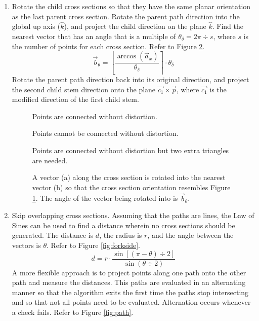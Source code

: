 \documentclass[10pt]{article}
\begin{document}
\begin{enumerate}
\item Rotate the child cross sections so that they have the same planar orientation as the last parent cross section. Rotate the parent path direction into the global up axis ($ \hat{k} $), and project the child direction on the plane $ \hat{k} $. Find the nearest vector that has an angle that is a multiple of $ \theta_{\delta} = 2 \pi \div s $, where $ s $ is the number of points for each cross section. Refer to Figure \ref{fig:forktopangle}.
\[ \vec{b}_{\theta} = \left \lfloor \frac{\arccos(\vec{a}_x)}{\theta_{\delta}} \right\rceil \cdot \theta_{\delta} \]
Rotate the parent path direction back into its original direction, and project the second child stem direction onto the plane $ \vec{c_1} \times \vec{p} $, where $ \vec{c_1} $ is the modified direction of the first child stem.

\begin{figure}[H]
 \begin{minipage}[b]{0.46\textwidth}
  \centering
  
  \caption{Points are connected without distortion.} \label{fig:fork1}
 \end{minipage}
 \hfill
 \begin{minipage}[b]{0.46\textwidth}
  \centering
  
  \caption{Points cannot be connected without distortion.}
 \end{minipage}
\end{figure}
\begin{figure}[H]
 \begin{minipage}[b]{0.46\textwidth}
  \centering
  
  \caption{Points are connected without distortion but two extra triangles are needed.}
 \end{minipage}
 \hfill
 \begin{minipage}[b]{0.46\textwidth}
  \centering
  
  \caption{A vector (a) along the cross section is rotated into the nearest vector (b) so that the cross section orientation resembles Figure \ref{fig:fork1}. The angle of the vector being rotated into is $ \vec{b}_{\theta} $.} \label{fig:forktopangle}
 \end{minipage}
\end{figure}

\item Skip overlapping cross sections. Assuming that the paths are lines, the Law of Sines can be used to find a distance wherein no cross sections should be generated. The distance is $ d $, the radius is $ r $, and the angle between the vectors is $ \theta $. Refer to Figure \ref{fig:forkside}.
\[ d = r \cdot \frac{\sin[(\pi-\theta)\div2]}{\sin (\theta\div2)} \]
A more flexible approach is to project points along one path onto the other path and measure the distances. This paths are evaluated in an alternating manner so that the algorithm exits the first time the paths stop intersecting and so that not all points need to be evaluated. Alternation occurs whenever a check fails. Refer to Figure \ref{fig:path}.


\end{enumerate}
\end{document}
